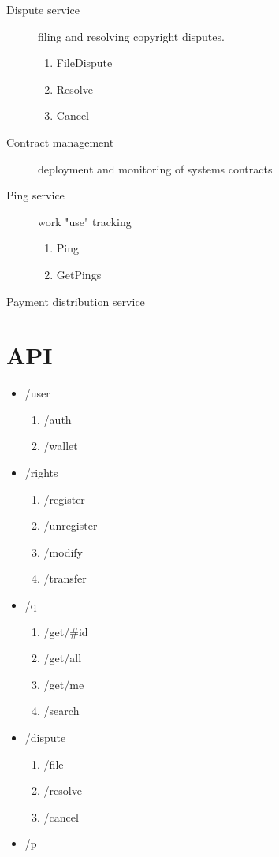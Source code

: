 \documentclass[12pt]{article}
\begin{document}
\begin{description}
\begin{enumerate}
			\end{enumerate}
		\item[Dispute service] filing and resolving copyright disputes.
			\begin{enumerate}
				\item FileDispute
				\item Resolve
				\item Cancel
			\end{enumerate}
		\item[Contract management] deployment and monitoring of systems contracts
		\item[Ping service] work "use" tracking
			\begin{enumerate}
				\item Ping
				\item GetPings
			\end{enumerate}
	\end{description}
	
	\begin{description}
		\item[Payment distribution service]	
	\end{description}

	\section{API}
	
	\begin{itemize}
		\item /user
			\begin{enumerate}
				\item /auth
				\item /wallet
			\end{enumerate}
		\item /rights
			\begin{enumerate}
				\item /register
				\item /unregister
				\item /modify
				\item /transfer
			\end{enumerate}
		\item /q
			\begin{enumerate}
				\item /get/\#id
				\item /get/all
				\item /get/me
				\item /search
			\end{enumerate}
		\item /dispute
			\begin{enumerate}
				\item /file
				\item /resolve
				\item /cancel
			\end{enumerate}
		\item /p

	\end{itemize}
	
\end{document}
